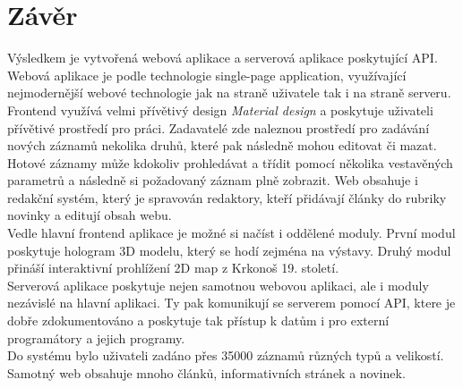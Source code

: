 \chapter*{Závěr}
\noindent
Výsledkem je vytvořená webová aplikace a serverová aplikace poskytující API.
\\


Webová aplikace je podle technologie single-page application,
využívající nejmodernější webové technologie jak na straně uživatele tak i na straně
serveru. Frontend využívá velmi přívětivý design \textit{Material design} a 
poskytuje uživateli přívětivé prostředí pro práci. Zadavatelé zde naleznou
prostředí pro zadávání nových záznamů nekolika druhů, které pak následně
mohou editovat či mazat. Hotové záznamy může kdokoliv prohledávat a
třídit pomocí několika vestavěných parametrů a následně si požadovaný záznam
plně zobrazit. Web obsahuje i redakční systém, který je spravován redaktory,
kteří přidávají články do rubriky novinky a editují obsah webu.
\\


Vedle hlavní frontend aplikace je možné si načíst i oddělené moduly.
První modul poskytuje hologram 3D modelu, který se hodí zejména na výstavy.
Druhý modul přináší interaktivní prohlížení 2D map z Krkonoš 19. století.
\\


Serverová aplikace poskytuje nejen samotnou webovou aplikaci, ale i 
moduly nezávislé na hlavní aplikaci. Ty pak komunikují se serverem pomocí API,
ktere je dobře zdokumentováno a poskytuje tak přístup k datům i pro 
externí programátory a jejich programy.
\\


Do systému bylo uživateli zadáno přes 35000 záznamů různých typů a velikostí.
Samotný web obsahuje mnoho článků, informativních stránek a novinek.


